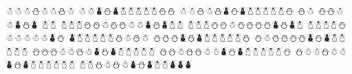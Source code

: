 \documentclass{article}
\begin{document}
\begin{whitesnowman}

       ☃☃☃⛄☃☃⛄☃
   ☃☃⛇⛄⛇☃☃☃☃☃⛄⛄
 ☃☃⛄☃⛄⛇⛄⛇☃☃☃☃☃⛄
⛄☃    ⛄⛄☃☃⛇⛄⛇    ☃☃
☃☃☃⛄⛄☃⛄⛄☃☃⛇⛄⛇☃☃
 ☃☃☃⛄⛄☃⛄⛄⛄⛄⛇⛄⛇☃
   ☃☃☃☃⛄☃☃☃☃☃⛇⛄
     ⛇☃☃☃☃☃⛄☃⛄☃
   ⛄⛄⛄⛇⛄⛇☃☃☃☃☃⛄
 ⛄☃⛄⛄⛄⛄⛇⛄⛇☃☃☃☃☃
⛄⛄⛄☃☃⛄☃⛇⛄⛇☃☃☃☃☃
⛄⛄☃⛄⛄☃☃⛇⛄⛇☃☃☃☃☃⛄
 ⛄☃☃⛄☃☃⛇⛄⛇☃☃☃☃☃☃
   ☃☃⛄☃⛄☃⛇⛄⛇☃☃⛇⛇⛇

\end{whitesnowman}
\end{document}
